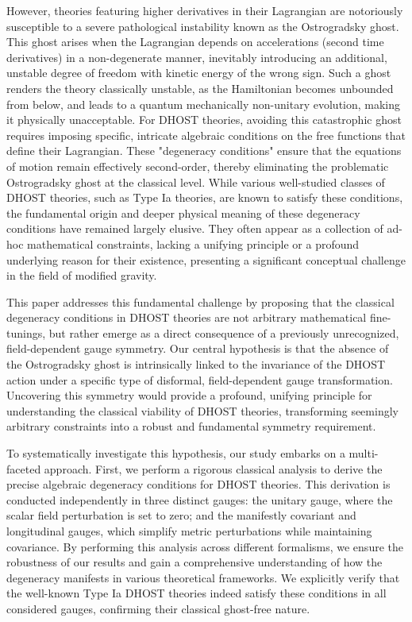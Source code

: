 \documentclass[twocolumn]{aastex631}
\begin{document}
However, theories featuring higher derivatives in their Lagrangian are notoriously susceptible to a severe pathological instability known as the Ostrogradsky ghost. This ghost arises when the Lagrangian depends on accelerations (second time derivatives) in a non-degenerate manner, inevitably introducing an additional, unstable degree of freedom with kinetic energy of the wrong sign. Such a ghost renders the theory classically unstable, as the Hamiltonian becomes unbounded from below, and leads to a quantum mechanically non-unitary evolution, making it physically unacceptable. For DHOST theories, avoiding this catastrophic ghost requires imposing specific, intricate algebraic conditions on the free functions that define their Lagrangian. These "degeneracy conditions" ensure that the equations of motion remain effectively second-order, thereby eliminating the problematic Ostrogradsky ghost at the classical level. While various well-studied classes of DHOST theories, such as Type Ia theories, are known to satisfy these conditions, the fundamental origin and deeper physical meaning of these degeneracy conditions have remained largely elusive. They often appear as a collection of ad-hoc mathematical constraints, lacking a unifying principle or a profound underlying reason for their existence, presenting a significant conceptual challenge in the field of modified gravity.

This paper addresses this fundamental challenge by proposing that the classical degeneracy conditions in DHOST theories are not arbitrary mathematical fine-tunings, but rather emerge as a direct consequence of a previously unrecognized, field-dependent gauge symmetry. Our central hypothesis is that the absence of the Ostrogradsky ghost is intrinsically linked to the invariance of the DHOST action under a specific type of disformal, field-dependent gauge transformation. Uncovering this symmetry would provide a profound, unifying principle for understanding the classical viability of DHOST theories, transforming seemingly arbitrary constraints into a robust and fundamental symmetry requirement.

To systematically investigate this hypothesis, our study embarks on a multi-faceted approach. First, we perform a rigorous classical analysis to derive the precise algebraic degeneracy conditions for DHOST theories. This derivation is conducted independently in three distinct gauges: the unitary gauge, where the scalar field perturbation is set to zero; and the manifestly covariant and longitudinal gauges, which simplify metric perturbations while maintaining covariance. By performing this analysis across different formalisms, we ensure the robustness of our results and gain a comprehensive understanding of how the degeneracy manifests in various theoretical frameworks. We explicitly verify that the well-known Type Ia DHOST theories indeed satisfy these conditions in all considered gauges, confirming their classical ghost-free nature.
\end{document}
